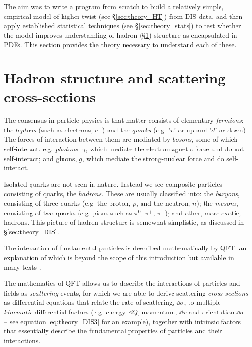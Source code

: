 \documentclass[12pt,a4paper]{report}
\begin{document}
The aim was to write a program from scratch to build a relatively simple, empirical model of higher twist (see \S \ref{sec:theory_HT}) from DIS data, and then apply established statistical techniques (see \S \ref{sec:theory_stats}) to test whether the model improves understanding of hadron (\S \ref{sec:theory_hadron}) structure as encapsulated in PDFs. This section provides the theory necessary to understand each of these.

\section{Hadron structure and scattering cross-sections} \label{sec:theory_hadron}

The consensus in particle physics is that matter consists of elementary \emph{fermions}: the \emph{leptons} (such as electrons, $e^-$) and the \emph{quarks} (e.g. '$u$' or up and '$d$' or down). The forces of interaction between them are mediated by \emph{bosons}, some of which self-interact: e.g. \emph{photons}, $\gamma$, which mediate the electromagnetic force and do not self-interact; and gluons, $g$, which mediate the strong-nuclear force and do self-interact.

Isolated quarks are not seen in nature. Instead we see composite particles consisting of quarks, the \emph{hadrons}. These are usually classified into: the \emph{baryons}, consisting of three quarks (e.g. the proton, $p$, and the neutron, $n$); the \emph{mesons}, consisting of two quarks (e.g. pions such as $\pi^0$, $\pi^+$, $\pi^-$); and other, more exotic, hadrons. This picture of hadron structure is somewhat simplistic, as discussed in \S \ref{sec:theory_DIS}.

The interaction of fundamental particles is described mathematically by QFT, an explanation of which is beyond the scope of this introduction but available in many texts \cite{MandlShaw} \cite{Maggiore} \cite{BurgessMoore} \cite{Paschos} \cite{CottinghamGreenwood}.

The mathematics of QFT allows us to describe the interactions of particles and fields as \emph{scattering} events, for which we are able to derive scattering \emph{cross-sections} as differential equations that relate the rate of scattering, $\dd{\sigma}$, to multiple \emph{kinematic} differential factors (e.g. energy, $\dd{Q}$, momentum, $\dd{x}$ and orientation $\dd{\sigma}$ -- see equation \ref{eq:theory_DIS3} for an example), together with intrinsic factors that essentially describe the fundamental properties of particles and their interactions.
\end{document}
